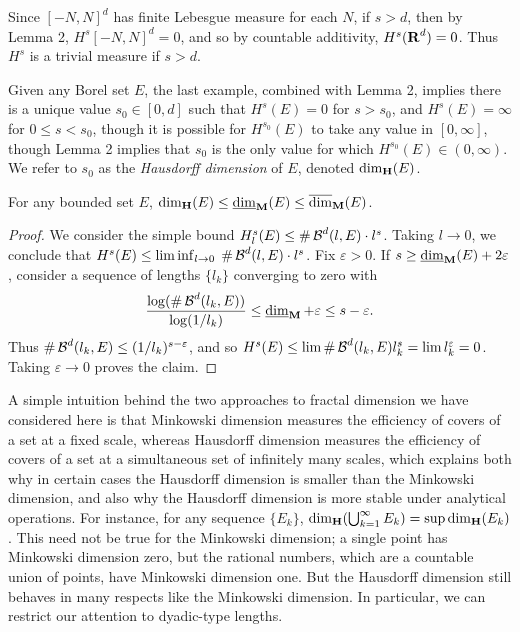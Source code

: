 \begin{example}
	Since $[-N,N]^d$ has finite Lebesgue measure for each $N$, if $s > d$, then by Lemma 2, $H^s[-N,N]^d = 0$, and so by countable additivity, $H^s(\operatorname{\mathbf{R}}^d) = 0$. Thus $H^s$ is a trivial measure if $s > d$.
\end{example}

Given any Borel set $E$, the last example, combined with Lemma 2, implies there is a unique value $s_0 \in [0,d]$ such that $H^s(E) = 0$ for $s > s_0$, and $H^s(E) = \infty$ for $0 \leq s < s_0$, though it is possible for $H^{s_0}(E)$ to take any value in $[0,\infty]$, though Lemma 2 implies that $s_0$ is the only value for which $H^{s_0}(E) \in (0,\infty)$. We refer to $s_0$ as the {\it Hausdorff dimension} of $E$, denoted $\operatorname{\dim_{\mathbf{H}}}(E)$.

\begin{theorem}
	For any bounded set $E$, $\operatorname{\dim_{\mathbf{H}}}(E) \leq \operatorname{\underline{\dim}_{\mathbf{M}}}(E) \leq \operatorname{\overline{\dim}_{\mathbf{M}}}(E)$.
\end{theorem}
\begin{proof}
	We consider the simple bound $H^s_l(E) \leq \# \operatorname{\mathcal{B}}^d(l,E) \cdot l^s$. Taking $l \to 0$, we conclude that $H^s(E) \leq \liminf_{l \to 0}\; \# \operatorname{\mathcal{B}}^d(l,E) \cdot l^s$. Fix $\varepsilon > 0$. If $s \geq \operatorname{\underline{\dim}_{\mathbf{M}}}(E) + 2\varepsilon$, consider a sequence of lengths $\{ l_k \}$ converging to zero with
	\[ \frac{\log(\# \operatorname{\mathcal{B}}^d(l_k,E))}{\log(1/l_k)} \leq \operatorname{\underline{\dim}_{\mathbf{M}}} + \varepsilon \leq s - \varepsilon. \]
	Thus $\# \operatorname{\mathcal{B}}^d(l_k,E) \leq (1/l_k)^{s - \varepsilon}$, and so $H^s(E) \leq \lim \# \operatorname{\mathcal{B}}^d(l_k,E) l_k^s = \lim l_k^\varepsilon = 0$. Taking $\varepsilon \to 0$ proves the claim.
\end{proof}

A simple intuition behind the two approaches to fractal dimension we have considered here is that Minkowski dimension measures the efficiency of covers of a set at a fixed scale, whereas Hausdorff dimension measures the efficiency of covers of a set at a simultaneous set of infinitely many scales, which explains both why in certain cases the Hausdorff dimension is smaller than the Minkowski dimension, and also why the Hausdorff dimension is more stable under analytical operations. For instance, for any sequence $\{ E_k \}$, $\operatorname{\dim_{\mathbf{H}}}(\bigcup_{k = 1}^\infty E_k) = \sup \operatorname{\dim_{\mathbf{H}}}(E_k)$. This need not be true for the Minkowski dimension; a single point has Minkowski dimension zero, but the rational numbers, which are a countable union of points, have Minkowski dimension one. But the Hausdorff dimension still behaves in many respects like the Minkowski dimension. In particular, we can restrict our attention to dyadic-type lengths.

